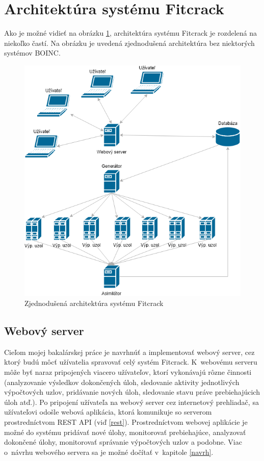 \documentclass[zadani,slovak]{fitthesis}
\begin{document}
\section{Architektúra systému Fitcrack}
Ako je možné vidieť na obrázku \ref{fig:archFitcrack}, architektúra systému Fitcrack je rozdelená na niekoľko častí. Na obrázku je uvedená zjednodušená architektúra bez niektorých systémov BOINC.

\begin{figure}[H]
    \centering
    \includegraphics[scale=0.65]{obrazky/FitcrackSystem.png}
    \caption{Zjednodušená architektúra systému Fitcrack}
    \label{fig:archFitcrack}
\end{figure}


\subsection{Webový server}
Cieľom mojej bakalárskej práce je navrhnúť a implementovať webový server, cez ktorý budú môcť užívatelia spravovať celý systém Fitcrack. K~webovému serveru môže byť naraz pripojených viacero užívateľov, ktorí vykonávajú rôzne činnosti (analyzovanie výsledkov dokončených úloh, sledovanie aktivity jednotlivých výpočtových uzlov, pridávanie nových úloh, sledovanie stavu práve prebiehajúcich úloh atď.). Po pripojení užívateľa na webový server cez internetový prehliadač, sa užívateľovi odošle webová aplikácia, ktorá komunikuje so serverom prostredníctvom REST API (viď \ref{rest}). Prostredníctvom webovej aplikácie je možné do systému pridávať nové úlohy, monitorovať prebiehajúce, analyzovať dokončené úlohy, monitorovať správanie výpočtových uzlov a podobne. Viac o~návrhu webového servera sa je možné dočítať v~kapitole \ref{navrh}.
\end{document}
